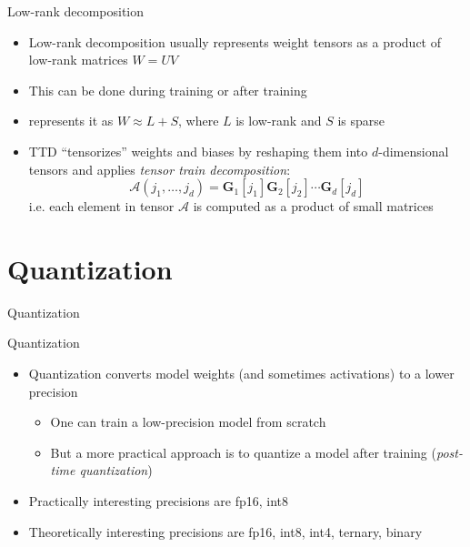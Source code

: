 \documentclass[10pt, handout]{beamer}
\begin{document}
\begin{frame}{Low-rank decomposition}
    \begin{itemize}
        \pause\item Low-rank decomposition usually represents weight tensors as a product of low-rank matrices $W = UV$
        \pause\item This can be done during training or after training
        \pause\item \cite{Low_rank_and_sparse_decomposition} represents it as $W \approx L + S$, where $L$ is low-rank and $S$ is sparse
        \pause\item TTD \cite{TTD} ``tensorizes'' weights and biases by reshaping them into $d$-dimensional tensors and applies \textit{tensor train decomposition}:
        \begin{equation}
        \mathcal{A}\left(j_{1}, \ldots, j_{d}\right)=\boldsymbol{G}_{1}\left[j_{1}\right] \boldsymbol{G}_{2}\left[j_{2}\right] \cdots \boldsymbol{G}_{d}\left[j_{d}\right]
        \end{equation}
        i.e. each element in tensor $\mathcal{A}$ is computed as a product of small matrices
    \end{itemize}
\end{frame}

\section{Quantization}
\begin{frame}
    Quantization
\end{frame}

\begin{frame}{Quantization}
    \begin{itemize}
        \item\pause Quantization converts model weights (and sometimes activations) to a lower precision
        \begin{itemize}
            \item\pause One can train a low-precision model from scratch
            \item\pause But a more practical approach is to quantize a model after training (\textit{post-time quantization})
        \end{itemize}
        \item\pause Practically interesting precisions are fp16, int8
        \item\pause Theoretically interesting precisions are fp16, int8, int4, ternary, binary
    \end{itemize}
\end{frame}
\end{document}
